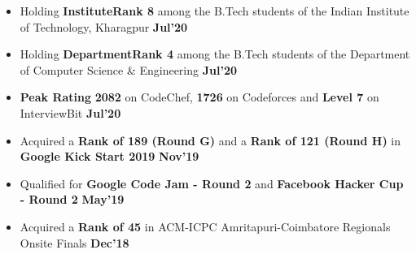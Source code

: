 \documentclass[10pt]{article}
\begin{document}
\vspace{-2.2ex}
{\color{headliner} \spacedhrule{0.15ex}{1.0ex}}
\begin{itemize}[leftmargin=*]
\item Holding \textbf{InstituteRank 8} among the B.Tech students of the Indian Institute of Technology, Kharagpur {\hfill}\textbf{Jul'20}\\[-1.8em]
\item Holding \textbf{DepartmentRank 4} among the B.Tech students of the Department of Computer Science \& Engineering {\hfill}\textbf{Jul'20}\\[-1.8em]
\item \textbf{Peak Rating} \textbf{2082} on CodeChef, \textbf{1726} on Codeforces and \textbf{Level 7} on InterviewBit \href{https://github.com/shmundhra/Credentials/tree/master/Competitive\%20Programming/Online\%20Judges\%20Profiles} {\hspace{0.5ex}\footnotesize\faMousePointer} {\hfill}\textbf{Jul'20}\\[-1.8em]
\item Acquired a \textbf{Rank of 189 (Round G)} and a  \textbf{Rank of 121 (Round H)} in \textbf{Google Kick Start 2019} \href{https://github.com/shmundhra/Credentials/tree/master/Competitive\%20Programming/Google\%20KickStart} {\hspace{1ex}\footnotesize\faMousePointer} {\hfill}\textbf{Nov'19}\\[-1.8em]
\item Qualified for \textbf{Google Code Jam - Round 2} and \textbf{Facebook Hacker Cup - Round 2} \href{https://github.com/shmundhra/Credentials/tree/master/Competitive\%20Programming/Google\%20CodeJam} {\hspace{1ex}\footnotesize\faMousePointer} \href{https://github.com/shmundhra/Credentials/tree/master/Competitive\%20Programming/Facebook\%20Hacker\%20Cup} {\hspace{0.5ex}\footnotesize\faMousePointer} {\hfill}\textbf{May'19}\\[-1.8em]
\item Acquired a \textbf{Rank of 45} in ACM-ICPC Amritapuri-Coimbatore Regionals Onsite Finals \href{https://github.com/shmundhra/Credentials/tree/master/Competitive\%20Programming/ACM\%20ICPC\%202018} {\hspace{0.5ex}\footnotesize\faMousePointer} {\hfill}\textbf{Dec'18}\\[-1.8em]

\end{itemize}
\end{document}
